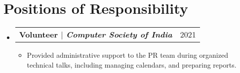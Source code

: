 \documentclass[12pt, a4paper]{article}
\makeatletter
\newcommand{\resumeItem}[1]{
  \item\small{
    {#1 \vspace{-2pt}}
  }
}
\newcommand{\resumeSubheading}[4]{
  \vspace{-2pt}\item
    \begin{tabular*}{0.97\textwidth}[t]{l@{\extracolsep{\fill}}r}
      \textbf{#1} & #2 \\
      \textit{\small#3} & \textit{\small #4} \\
    \end{tabular*}\vspace{-9pt}
}
\newcommand{\resumeProjectHeading}[2]{
    \item
    \begin{tabular*}{0.97\textwidth}{l@{\extracolsep{\fill}}r}
      \small#1 & #2 \\
    \end{tabular*}\vspace{-6pt}
}
\newcommand{\resumeSubHeadingListStart}{\begin{itemize}[leftmargin=0.15in, label={}]}
\newcommand{\resumeSubHeadingListEnd}{\end{itemize}}
\newcommand{\resumeItemListStart}{\begin{itemize}}
\newcommand{\resumeItemListEnd}{\end{itemize}\vspace{-6pt}}
\makeatother
\begin{document}


\section{Positions of Responsibility}
  \resumeSubHeadingListStart
      \resumeProjectHeading
          {\textbf{Volunteer $|$ \emph{Computer Society of India}  } 
          }{2021}
          \resumeItemListStart
            \resumeItem{Provided administrative support to the PR team during organized technical talks, including managing calendars, and preparing reports.}
          \resumeItemListEnd
    \resumeSubHeadingListEnd

\end{document}
